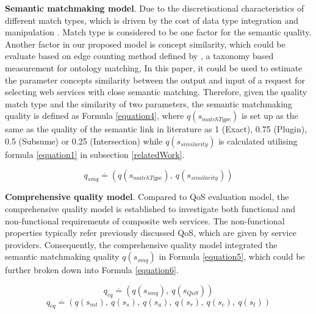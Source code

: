 \documentclass{llncs}
\begin{document}
\textbf{Semantic matchmaking model}. Due to the discretisational characteristics of different match types, which is driven by the cost of  data type integration and manipulation \cite{lecue2009optimizing}. Match type is considered to be one factor for the semantic quality. Another factor in our proposed model is concept similarity, which could be evaluate based on edge counting method defined by \cite{shet2012new}, a taxonomy based measurement for ontology matching, In this paper, it could be used to estimate the parameter concepts similarity between the output and input of a request for selecting web services with close semantic matching. Therefore, given the quality match type and the similarity of two parameters, the semantic matchmaking quality is defined as Formula \ref{equation4}, where $q(s_ {matchType})$ is set up as the same as the quality of the semantic link in literature \cite{lecue2009optimizing} as 1 (Exact), 0.75 (Plugin), 0.5 (Subsume) or 0.25 (Intersection) while $q(s_ {similarity})$ is calculated utilising formula \ref{equation1} in subsection \ref{relatedWork}.

\begin{equation}
\label{equation4}
q_{smq} \stackrel{.}{=} (q(s_ {matchType}), \  q(s_ {similarity}))
\end{equation}

\textbf{Comprehensive quality model}. Compared to QoS evaluation model, the comprehensive quality model is established to investigate both functional and non-functional requirements of composite web services. The non-functional properties typically refer previously discussed QoS, which are given by service providers. Consequently, the comprehensive quality model integrated the semantic matchmaking quality $q(s_{smq})$ in Formula \ref{equation5}, which could be further broken down into Formula \ref{equation6}.

\begin{equation}
\label{equation5}
q_{cq} \stackrel{.}{=} (q(s_ {smq}), \  q(s_ {QoS}))
\end{equation}
\begin{equation}
\label{equation6}
q_{cq} \stackrel{.}{=} (q(s_ {mt}), \  q(s_ {s}), \  q(s_{a}),\  q(s_{r}),\  q(s_{c}),\  q(s_{t}))
\end{equation}
\end{document}
